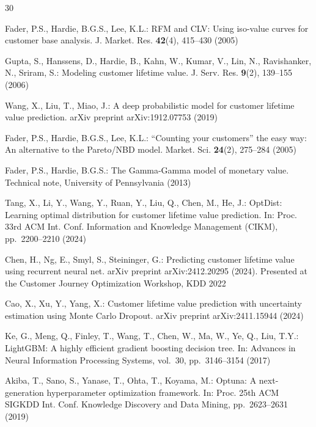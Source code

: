 \documentclass[pdflatex,sn-mathphys-num]{sn-jnl}
\theoremstyle{thmstyleone}
\theoremstyle{thmstyletwo}
\theoremstyle{thmstylethree}
\begin{document}
\begingroup
\footnotesize
\setlength{\bibsep}{0pt plus 0.1ex}
\setlength{\itemsep}{0pt}
\setlength{\parskip}{0pt}
\setlength{\parsep}{0pt}
\begin{thebibliography}{30}

Fader, P.S., Hardie, B.G.S., Lee, K.L.: RFM and CLV: Using iso-value curves
for customer base analysis. J. Market. Res. \textbf{42}(4), 415--430 (2005)

Gupta, S., Hanssens, D., Hardie, B., Kahn, W., Kumar, V., Lin, N.,
Ravishanker, N., Sriram, S.: Modeling customer lifetime value.
J. Serv. Res. \textbf{9}(2), 139--155 (2006)

Wang, X., Liu, T., Miao, J.: A deep probabilistic model for customer lifetime
value prediction. arXiv preprint arXiv:1912.07753 (2019)

Fader, P.S., Hardie, B.G.S., Lee, K.L.: ``Counting your customers'' the easy
way: An alternative to the Pareto/NBD model. Market. Sci. \textbf{24}(2),
275--284 (2005)

Fader, P.S., Hardie, B.G.S.: The Gamma-Gamma model of monetary value.
Technical note, University of Pennsylvania (2013)

Tang, X., Li, Y., Wang, Y., Ruan, Y., Liu, Q., Chen, M., He, J.: OptDist:
Learning optimal distribution for customer lifetime value prediction. In:
Proc. 33rd ACM Int. Conf. Information and Knowledge Management (CIKM),
pp.~2200--2210 (2024)

Chen, H., Ng, E., Smyl, S., Steininger, G.: Predicting customer lifetime value
using recurrent neural net. arXiv preprint arXiv:2412.20295 (2024).
Presented at the Customer Journey Optimization Workshop, KDD 2022

Cao, X., Xu, Y., Yang, X.: Customer lifetime value prediction with uncertainty
estimation using Monte Carlo Dropout. arXiv preprint arXiv:2411.15944 (2024)

Ke, G., Meng, Q., Finley, T., Wang, T., Chen, W., Ma, W., Ye, Q., Liu, T.Y.:
LightGBM: A highly efficient gradient boosting decision tree. In: Advances in
Neural Information Processing Systems, vol.~30, pp.~3146--3154 (2017)

Akiba, T., Sano, S., Yanase, T., Ohta, T., Koyama, M.: Optuna: A
next-generation hyperparameter optimization framework. In: Proc. 25th ACM
SIGKDD Int. Conf. Knowledge Discovery and Data Mining, pp.~2623--2631 (2019)


\end{thebibliography}
\end{document}

